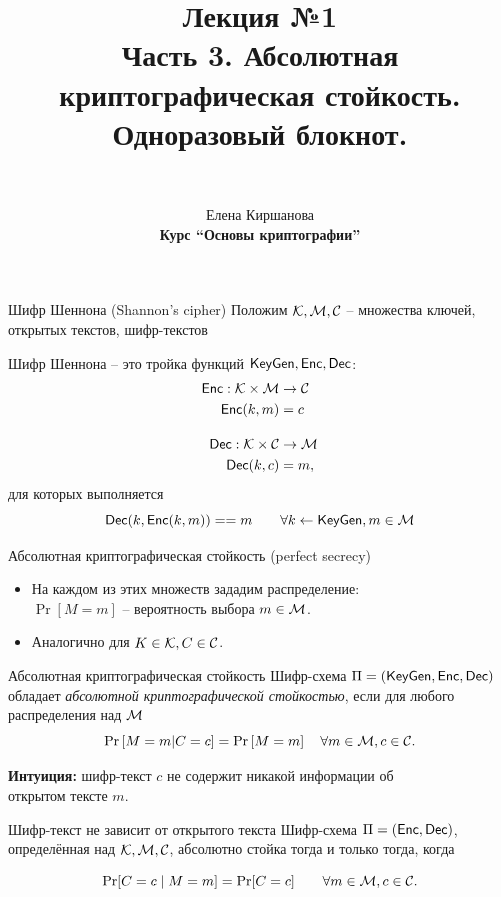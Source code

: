 \documentclass[usenames,dvipsnames,8pt,aspectratio=169]{beamer}
\author{\\ [10pt]
}
\title{Лекция №1 \\[10pt]
		Часть 3. Абсолютная криптографическая стойкость. \\ Одноразовый блокнот.}
\date{ Елена Киршанова \\  \textbf{Курс ``Основы криптографии''} \\  }
\begin{document}
	
\begin{frame}
	\titlepage
\end{frame}

\begin{frame}{Шифр Шеннона (Shannon's cipher)}
\Large
Положим $\mathcal{K}, \mathcal{M}, \mathcal{C}$ -- множества ключей, открытых текстов, шифр-текстов 
\begin{block}{Шифр Шеннона --}
			это тройка функций $\textsf{KeyGen}, \textsf{Enc}, \textsf{Dec}$:
			\begin{align*}
				\textsf{Enc}: \mathcal{K} \times \mathcal{M} & \rightarrow \mathcal{C} \\
				\textsf{Enc}(k, m)  &= c  \\[10pt]
				\textsf{Dec}: \mathcal{K} \times \mathcal{C} & \rightarrow \mathcal{M} \\
				\textsf{Dec}(k, c) &= m,
			\end{align*}
			для которых выполняется 
			\[
				\textsf{Dec}(k, \textsf{Enc}(k,m)) == m \qquad \forall k \leftarrow \textsf{KeyGen}, m \in \mathcal{M} 
			\]
\end{block}
\end{frame}

\begin{frame}{Абсолютная криптографическая стойкость (perfect secrecy)}
\Large
	\begin{itemize}
		\itemsep 5pt
		\item На каждом из этих множеств зададим распределение:  \\ $\Pr[M = m]$ -- вероятность выбора $m \in \mathcal{M}$.
		\item Аналогично для $K \in \mathcal{K}, C \in \mathcal{C}$.
	\end{itemize}

	\begin{block}{Абсолютная криптографическая стойкость}
		Шифр-схема $\Pi = (\textsf{KeyGen}, \textsf{Enc}, \textsf{Dec})$ обладает \emph{абсолютной криптографической стойкостью}, если для любого распределения над $\mathcal{M}$
		\[
			\Pr \left[ M= m | C = c\right] = \Pr\left[M = m\right] \quad \forall m \in \mathcal{M}, c \in \mathcal{C}.
		\]
	\end{block}
	\textbf{Интуиция:} шифр-текст $c$ не содержит никакой информации об \\ открытом тексте $m$.
\end{frame}

\begin{frame}{Шифр-текст не зависит от открытого текста}
	\Large
	\vspace{-50pt}
	  Шифр-схема $\Pi = (\textsf{Enc}, \textsf{Dec})$, определённая над $\mathcal{K}, \mathcal{M}, \mathcal{C}$, абсолютно стойка тогда и только тогда, когда 

	\[
		\Pr[C = c \; |\; M =m  ] = \Pr[C = c] \qquad \forall m \in \mathcal{M}, c \in \mathcal{C}.
	\]
	

\end{frame}
\end{document}
